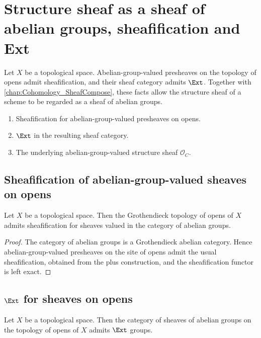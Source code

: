 \chapter{Structure sheaf as a sheaf of abelian groups, sheafification and Ext}
\label{chap:Cohomology_StructureSheafAb}

Let \(X\) be a topological space. Abelian-group-valued presheaves on the topology of opens admit sheafification, and their sheaf category admits \(\Ext\). Together with \cref{chap:Cohomology_SheafCompose}, these facts allow the structure sheaf of a scheme to be regarded as a sheaf of abelian groups.

\begin{enumerate}
  \item Sheafification for abelian-group-valued presheaves on opens.
  \item \(\Ext\) in the resulting sheaf category.
  \item The underlying abelian-group-valued structure sheaf \(\mathcal O_C\).
\end{enumerate}

\section{Sheafification of abelian-group-valued sheaves on opens}

\begin{theorem}\leanok
  \label{thm:HasSheafify_Opens_AddCommGrp}
  Let \(X\) be a topological space. Then the Grothendieck topology of opens of \(X\) admits sheafification for sheaves valued in the category of abelian groups.
\end{theorem}

\begin{proof}


\leanok
  The category of abelian groups is a Grothendieck abelian category. Hence abelian-group-valued presheaves on the site of opens admit the usual sheafification, obtained from the plus construction, and the sheafification functor is left exact.
\end{proof}

\section{\(\Ext\) for sheaves on opens}

\begin{theorem}\leanok
  \label{thm:HasExt_Sheaf_Opens_AddCommGrp}

  Let \(X\) be a topological space. Then the category of sheaves of abelian groups on the topology of opens of \(X\) admits \(\Ext\) groups.
\end{theorem}

